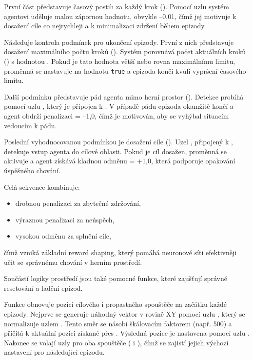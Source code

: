 První část představuje časový postih za každý krok (). Pomocí uzlu  systém agentovi uděluje malou zápornou hodnotu, obvykle –0{,}01, čímž jej motivuje k dosažení cíle co nejrychleji a k minimalizaci zdržení během epizody.

Následuje kontrola podmínek pro ukončení epizody. První z nich představuje dosažení maximálního počtu kroků (). Systém porovnává počet aktuálních kroků () s hodnotou . Pokud je tato hodnota větší nebo rovna maximálnímu limitu, proměnná  se nastavuje na hodnotu \texttt{true} a epizoda končí kvůli vypršení časového limitu.

Další podmínku představuje pád agenta mimo herní prostor (). Detekce probíhá pomocí uzlu , který je připojen k . V případě pádu epizoda okamžitě končí a agent obdrží penalizaci  = –1{,}0, čímž je motivován, aby se vyhýbal situacím vedoucím k pádu.

Poslední vyhodnocovanou podmínkou je dosažení cíle (). Uzel , připojený k , detekuje vstup agenta do cílové oblasti. Pokud je cíl dosažen, proměnná  se aktivuje a agent získává kladnou odměnu  = +1{,}0, která podporuje opakování úspěšného chování.

Celá sekvence kombinuje:

\begin{itemize}
\item drobnou penalizaci za zbytečné zdržování,
\item výraznou penalizaci za neúspěch,
\item vysokou odměnu za splnění cíle,
\end{itemize}

čímž vzniká základní reward shaping, který pomáhá neuronové síti efektivněji učit se správnému chování v herním prostředí.

\newpage

Součástí logiky prostředí jsou také pomocné funkce, které zajišťují správné resetování a ladění epizod.

Funkce  obnovuje pozici cílového i propastného spouštěče na začátku každé epizody. Nejprve se generuje náhodný vektor v rovině XY pomocí uzlu , který se normalizuje uzlem . Tento směr se násobí škálovacím faktorem (např. 500) a přičítá k aktuální pozici získané přes . Výsledná pozice je nastavena pomocí uzlu . Nakonec se volají uzly  pro oba spouštěče ( i ), čímž se zajistí jejich výchozí nastavení pro následující epizodu.

